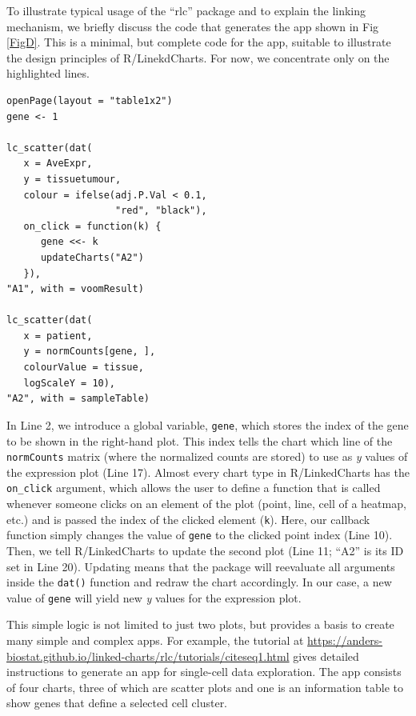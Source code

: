 \documentclass[twocolumn,10pt]{article}
\begin{document}
To illustrate typical usage of the ``rlc'' package and to explain the linking mechanism, we briefly discuss the code that generates the app shown in Fig \ref{FigD}. This is a minimal, but complete code for the app, suitable to illustrate the design principles of R/LinekdCharts. For now, we concentrate only on the highlighted lines.

\begin{verbatim}
openPage(layout = "table1x2")
gene <- 1

lc_scatter(dat(
   x = AveExpr,
   y = tissuetumour,
   colour = ifelse(adj.P.Val < 0.1, 
                   "red", "black"),
   on_click = function(k) {
      gene <<- k
      updateCharts("A2")
   }),
"A1", with = voomResult)

lc_scatter(dat(
   x = patient,
   y = normCounts[gene, ],
   colourValue = tissue, 
   logScaleY = 10),
"A2", with = sampleTable)
\end{verbatim}

In Line 2, we introduce a global variable, \texttt{gene}, which stores the index of the gene to be shown in the right-hand plot. This index tells the chart which line of the \texttt{normCounts} matrix (where the normalized counts are stored) to use as \emph{y} values of the expression plot (Line 17). Almost every chart type in R/LinkedCharts has the \texttt{on_click} argument, which allows the user to define a function that is called whenever someone clicks on an element of the plot (point, line, cell of a heatmap, etc.) and is passed the index of the clicked element (\texttt{k}).  Here, our callback function simply changes the value of \texttt{gene} to the clicked point index (Line 10). Then, we tell R/LinkedCharts to update the second plot (Line 11; ``A2'' is its ID set in Line 20). Updating means that the package will reevaluate all arguments inside the \texttt{dat()} function and redraw the chart accordingly. In our case, a new value of \texttt{gene} will yield new \emph{y} values for the expression plot.

This simple logic is not limited to just two plots, but provides a basis to create many simple and complex apps. For example, the tutorial at \url{https://anders-biostat.github.io/linked-charts/rlc/tutorials/citeseq1.html} gives detailed instructions to generate an app for single-cell data exploration. The app consists of four charts, three of which are scatter plots and one is an information table to show genes that define a selected cell cluster.
\end{document}
